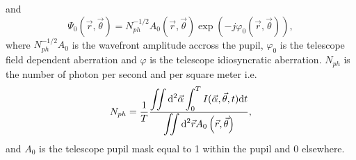 \documentclass{gmto}
\begin{document}
and
\begin{equation}
  \label{eq:6}
  \Psi_0\left( \vec r,\vec \theta \right)= N_{ph}^{-1/2}A_0\left( \vec r,\vec \theta \right) \exp\left( -j\varphi_0\left( \vec r,\vec \theta \right) \right), 
\end{equation}
where $N_{ph}^{-1/2}A_0$ is the wavefront amplitude accross the pupil, $\varphi_0$ is the
telescope field dependent aberration and $\varphi$ is the telescope
idiosyncratic aberration.
$N_{ph}$ is the number of photon per second and per square meter i.e.
\begin{equation}
  \label{eq:7}
  N_{ph} = {1\over T}{ \displaystyle\iint {\mathrm d}^2\vec\alpha  \int_0^T I(\vec\alpha,\vec \theta, t){\mathrm d}t  \over \displaystyle\iint {\mathrm d}^2\vec r A_0\left( \vec r,\vec \theta \right) },
\end{equation}
and $A_0$ is the telescope pupil mask equal to 1 within the pupil and 0 elsewhere.

 

\end{document}
